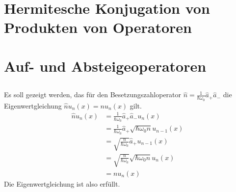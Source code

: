 \section{Hermitesche Konjugation von Produkten von Operatoren}

\section{Auf- und Absteigeoperatoren}

\subsection{}

\subsection{}

Es soll gezeigt werden, das für den Besetzungszahloperator $\hat n =
\frac1{\hbar\omega_0}\hat a_+\hat a_-$ die Eigenwertgleichung $\hat nu_n(x) =
nu_n(x)$ gilt.
\begin{align*}
    \hat n u_n(x) &= \frac1{\hbar\omega_0}\hat a_+\hat a_- u_n(x) \\
                  &= \frac1{\hbar\omega_0}\hat a_+ \sqrt{\hbar\omega_0n}u_{n-1}(x) \\
                  &= \sqrt{\frac{n}{\hbar\omega_0}} \hat a_+ u_{n-1}(x) \\
                  &= \sqrt{\frac{n}{\hbar\omega_0}} \sqrt{\hbar\omega_0n}u_n(x) \\
                  &= nu_n(x)
\end{align*}
Die Eigenwertgleichung ist also erfüllt.

\subsection{}
\subsection{}
\subsection{}


